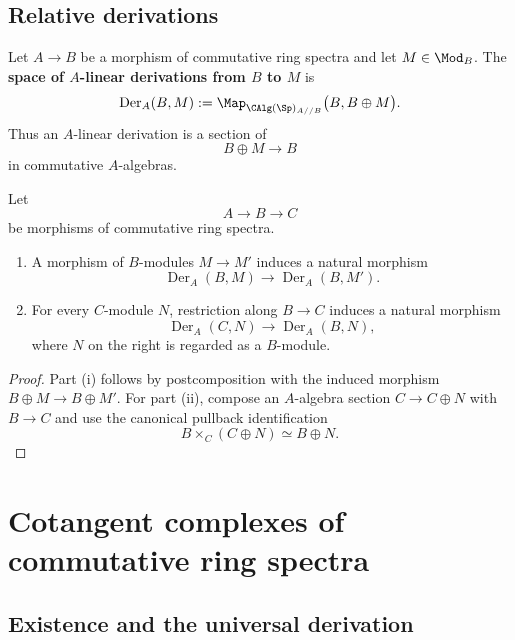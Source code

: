 \subsection{Relative derivations}

\begin{definition}
\label{def:spectral-derivation}
Let $A\to B$ be a morphism of commutative ring spectra and let
$M\in\Mod_B$. The \textbf{space of $A$-linear derivations from $B$ to
$M$} is
\[
    \operatorname{Der}_A(B,M)
    :=
    \Map_{\CAlg(\Sp)_{A//B}}
    \bigl(
        B,
        B\oplus M
    \bigr).
\]
Thus an $A$-linear derivation is a section of
\[
    B\oplus M
    \longrightarrow
    B
\]
in commutative $A$-algebras.
\end{definition}

\begin{proposition}
\label{prop:elementary-derivation-functoriality}
Let
\[
    A
    \longrightarrow
    B
    \longrightarrow
    C
\]
be morphisms of commutative ring spectra.
\begin{enumerate}[label=(\roman*)]
    \item A morphism of $B$-modules $M\to M'$ induces a natural morphism
    \[
        \operatorname{Der}_A(B,M)
        \longrightarrow
        \operatorname{Der}_A(B,M').
    \]

    \item For every $C$-module $N$, restriction along $B\to C$ induces a
    natural morphism
    \[
        \operatorname{Der}_A(C,N)
        \longrightarrow
        \operatorname{Der}_A(B,N),
    \]
    where $N$ on the right is regarded as a $B$-module.
\end{enumerate}
\end{proposition}

\begin{proof}
Part (i) follows by postcomposition with the induced morphism
$B\oplus M\to B\oplus M'$. For part (ii), compose an $A$-algebra
section $C\to C\oplus N$ with $B\to C$ and use the canonical pullback
identification
\[
    B\times_C(C\oplus N)
    \simeq
    B\oplus N.
\]
\end{proof}

\section{Cotangent complexes of commutative ring spectra}
\label{sec:affine-cotangent-complexes}

\subsection{Existence and the universal derivation}

